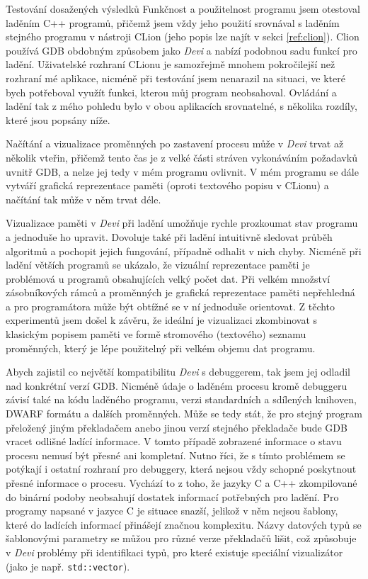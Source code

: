 \documentclass[czech,bachelor,male,python,dept460,hidelinks]{diploma}						%
\newcommand{\parspace}[1][]{
	\ifthenelse{\isempty{#1}}{\vspace{5mm}}{\vspace{#1}}
	\par
}
\begin{document}
\begin{section}{Testování dosažených výsledků}
	Funkčnost a použitelnost programu jsem otestoval laděním C++ programů, přičemž jsem vždy jeho použití srovnával s laděním stejného programu v nástroji
	CLion (jeho popis lze najít v sekci \ref{ref:clion}). Clion používá GDB obdobným způsobem jako \textit{Devi} a nabízí podobnou sadu funkcí pro ladění.
	Uživatelské rozhraní CLionu je samozřejmě mnohem pokročilejší než rozhraní mé aplikace, nicméně při testování jsem nenarazil na situaci,
	ve které bych potřeboval využít funkci, kterou můj program neobsahoval. Ovládání a ladění tak z mého pohledu bylo v obou aplikacích srovnatelné,
	s několika rozdíly, které jsou popsány níže.

	\parspace Načítání a vizualizace proměnných po zastavení procesu může v \textit{Devi} trvat až několik vteřin, přičemž tento čas je z velké části stráven
	vykonáváním požadavků uvnitř GDB, a nelze jej tedy v mém programu ovlivnit. V mém programu se dále vytváří grafická reprezentace paměti
	(oproti textového popisu v CLionu) a načítání tak může v něm trvat déle.

	\parspace Vizualizace paměti v \textit{Devi} při ladění umožňuje rychle prozkoumat stav programu a jednoduše ho upravit.
	Dovoluje také při ladění intuitivně sledovat průběh algoritmů a pochopit jejich fungování, případně odhalit v nich chyby.
	Nicméně při ladění větších programů se ukázalo, že vizuální reprezentace paměti je problémová u programů obsahujících velký počet dat.
	Při velkém množství zásobníkových rámců a proměnných je grafická reprezentace paměti nepřehledná a pro programátora může být obtížné se v ní
	jednoduše orientovat. Z těchto experimentů jsem došel k závěru, že ideální je vizualizaci zkombinovat s klasickým popisem paměti ve formě stromového
	(textového) seznamu proměnných, který je lépe použitelný při velkém objemu dat programu.
	
	\parspace Abych zajistil co největší kompatibilitu \textit{Devi} s debuggerem, tak jsem jej odladil nad konkrétní verzí GDB. Nicméně údaje o laděném procesu kromě
	debuggeru závisí také na kódu laděného programu, verzi standardních a sdílených knihoven, DWARF formátu a dalších proměnných.
	Může se tedy stát, že pro stejný program přeložený jiným překladačem anebo jinou verzí stejného překladače bude GDB vracet odlišné ladící informace.
	V tomto případě zobrazené informace o stavu procesu nemusí být přesné ani kompletní. Nutno říci, že s tímto problémem
	se potýkají i ostatní rozhraní pro debuggery, která nejsou vždy schopné poskytnout přesné informace o procesu. Vychází to z toho, že jazyky C a
	C++ zkompilované do binární podoby neobsahují dostatek informací potřebných pro ladění. Pro programy napsané v jazyce C je situace snazší, jelikož v něm
	nejsou šablony, které do ladících informací přinášejí značnou komplexitu. Názvy datových typů se šablonovými parametry se můžou pro různé verze překladačů
	lišit, což způsobuje v \textit{Devi} problémy při identifikaci typů, pro které existuje speciální vizualizátor (jako je např. \texttt{std::vector}).
\end{section}
\end{document}
